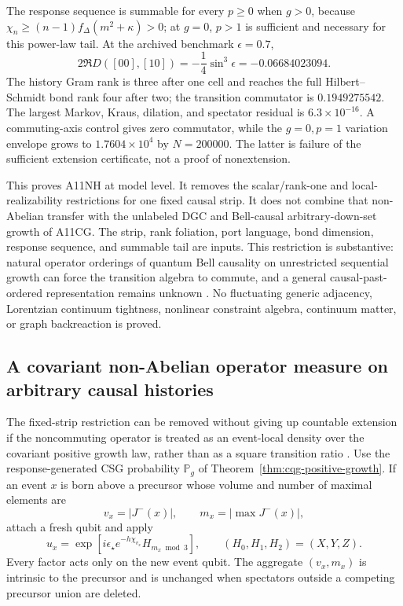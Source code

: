 The response sequence is summable for every \(p\ge0\) when \(g>0\),
because \(\chi_n\ge(n-1)f_\Delta(m^2+\kappa)>0\); at \(g=0\), \(p>1\)
is sufficient and necessary for this power-law tail.  At the archived
benchmark \(\epsilon=0.7\),
\[
 2\Re D([00],[10])=-\frac14\sin^3\epsilon=-0.06684023094.
\]
The history Gram rank is three after one cell and reaches the full
Hilbert--Schmidt bond rank four after two; the transition commutator is
\(0.1949275542\).  The largest Markov, Kraus, dilation, and spectator
residual is \(6.3\times10^{-16}\).  A commuting-axis control gives zero
commutator, while the \(g=0,p=1\) variation envelope grows to
\(1.7604\times10^4\) by \(N=200000\).  The latter is failure of the
sufficient extension certificate, not a proof of nonextension.

This proves A11NH at model level.  It removes the scalar/rank-one and
local-realizability restrictions for one fixed causal strip.  It does not
combine that non-Abelian transfer with the unlabeled DGC and Bell-causal
arbitrary-down-set growth of A11CG.  The strip, rank foliation, port
language, bond dimension, response sequence, and summable tail are inputs.
This restriction is substantive: natural operator orderings of quantum
Bell causality on unrestricted sequential growth can force the transition
algebra to commute, and a general causal-past-ordered representation remains
unknown \cite{SrivastavaSurya2026}.
No fluctuating generic adjacency, Lorentzian continuum tightness, nonlinear
constraint algebra, continuum matter, or graph backreaction is proved.

\subsection{A covariant non-Abelian operator measure on arbitrary causal
histories}
\label{sec:covariant-nonabelian-holonomy}

The fixed-strip restriction can be removed without giving up countable
extension if the noncommuting operator is treated as an event-local density
over the covariant positive growth law, rather than as a square transition
ratio \cite{XuCovariantNonAbelianHolonomy2026}.  Use the response-generated
CSG probability \(\mathbb P_g\) of
Theorem~\ref{thm:cqg-positive-growth}.  If an event \(x\) is born above a
precursor whose volume and number of maximal elements are
\[
 v_x=|J^-(x)|,\qquad m_x=|\max J^-(x)|,
\]
attach a fresh qubit and apply
\begin{equation}
 u_x=
 \exp\!\left[
 i\epsilon_\star e^{-h\chi_{v_x}}H_{m_x\bmod3}
 \right],
 \qquad (H_0,H_1,H_2)=(X,Y,Z).
 \label{eq:cnh-gate}
\end{equation}
Every factor acts only on the new event qubit.  The aggregate
\((v_x,m_x)\) is intrinsic to the precursor and is unchanged when spectators
outside a competing precursor union are deleted.


